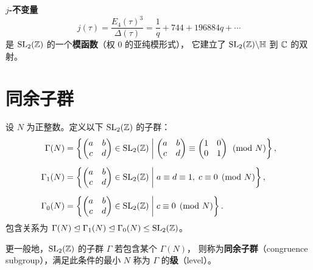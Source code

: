 \begin{example}[$j$-不变量]
\label{ex:j-invariant-function}
\textbf{$j$-不变量}
\[
  j(\tau) = \frac{E_4(\tau)^3}{\Delta(\tau)} = \frac{1}{q} + 744 + 196884q + \cdots
\]
是 $\mathrm{SL}_2(\mathbb{Z})$ 的一个\textbf{模函数}（权 $0$ 的亚纯模形式），
它建立了 $\mathrm{SL}_2(\mathbb{Z}) \backslash \mathbb{H}$ 到 $\mathbb{C}$ 的双射。
\end{example}


\section{同余子群}
\label{sec:congruence-subgroups}

\begin{definition}[同余子群]
\label{def:congruence-subgroups}
设 $N$ 为正整数。定义以下 $\mathrm{SL}_2(\mathbb{Z})$ 的子群：
\begin{align}
  \Gamma(N) &= \left\{
    \begin{pmatrix} a & b \\ c & d \end{pmatrix} \in \mathrm{SL}_2(\mathbb{Z})
    \;\middle|\;
    \begin{pmatrix} a & b \\ c & d \end{pmatrix}
    \equiv \begin{pmatrix} 1 & 0 \\ 0 & 1 \end{pmatrix} \pmod{N}
  \right\}, \\[6pt]
  \Gamma_1(N) &= \left\{
    \begin{pmatrix} a & b \\ c & d \end{pmatrix} \in \mathrm{SL}_2(\mathbb{Z})
    \;\middle|\;
    a \equiv d \equiv 1,\; c \equiv 0 \pmod{N}
  \right\}, \\[6pt]
  \Gamma_0(N) &= \left\{
    \begin{pmatrix} a & b \\ c & d \end{pmatrix} \in \mathrm{SL}_2(\mathbb{Z})
    \;\middle|\;
    c \equiv 0 \pmod{N}
  \right\}.
\end{align}
包含关系为 $\Gamma(N) \trianglelefteq \Gamma_1(N) \trianglelefteq \Gamma_0(N)
\leq \mathrm{SL}_2(\mathbb{Z})$。

更一般地，$\mathrm{SL}_2(\mathbb{Z})$ 的子群 $\Gamma$ 若包含某个 $\Gamma(N)$，
则称为\textbf{同余子群}（congruence subgroup），满足此条件的最小 $N$ 称为
$\Gamma$ 的\textbf{级}（level）。
\end{definition}

